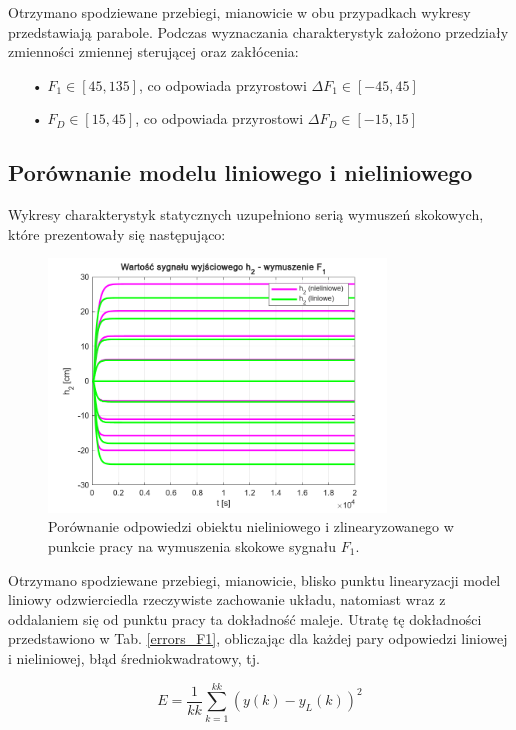 \noindent Otrzymano spodziewane przebiegi, mianowicie w obu przypadkach wykresy przedstawiają parabole. Podczas wyznaczania charakterystyk założono przedziały zmienności zmiennej sterującej oraz zakłócenia:
\begin{itemize}
\item[•] $F_1 \in [45, 135]$, co odpowiada przyrostowi $\Delta F_1 \in [-45, 45]$
\item[•] $F_D \in [15, 45]$, co odpowiada przyrostowi $\Delta F_D \in [-15, 15]$
\end{itemize}

\newpage

\subsection{Porównanie modelu liniowego i nieliniowego}

Wykresy charakterystyk statycznych uzupełniono serią wymuszeń skokowych, które prezentowały się następująco:

\begin{figure}[h!]
\centering
\includegraphics[width=0.8\textwidth]{pictures/wymuszenie_F1}
\caption{Porównanie odpowiedzi obiektu nieliniowego i zlinearyzowanego w punkcie pracy na wymuszenia skokowe sygnału $F_1$.}
\end{figure}

Otrzymano spodziewane przebiegi, mianowicie, blisko punktu linearyzacji model liniowy odzwierciedla rzeczywiste zachowanie układu, natomiast wraz z oddalaniem się od punktu pracy ta dokładność maleje. Utratę tę dokładności przedstawiono w Tab. \ref{errors_F1}, obliczając dla każdej pary odpowiedzi liniowej i nieliniowej, błąd średniokwadratowy, tj.

\begin{equation}
E = \frac{1}{kk} \sum_{k=1}^{kk} (y(k) - y_L(k))^2
\end{equation}

